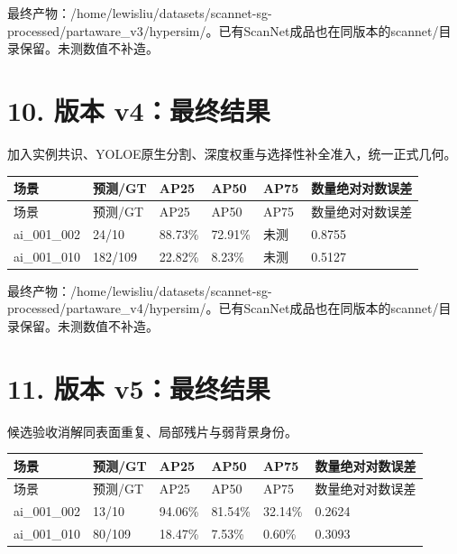 \documentclass[UTF8,fontset=fandol]{ctexart}
\begin{document}
最终产物：/home/lewisliu/datasets/scannet-sg-processed/partaware\_v3/hypersim/。已有ScanNet成品也在同版本的scannet/目录保留。未测数值不补造。



\section*{10. 版本 v4：最终结果}

加入实例共识、YOLOE原生分割、深度权重与选择性补全准入，统一正式几何。



{\small
\begin{longtable}{|p{}|p{}|p{}|p{}|p{}|p{}|}
\hline
场景 & 预测/GT & AP25 & AP50 & AP75 & 数量绝对对数误差 \\ \hline
\endfirsthead
\hline
场景 & 预测/GT & AP25 & AP50 & AP75 & 数量绝对对数误差 \\ \hline
\endhead
ai\_001\_002 & 24/10 & 88.73\% & 72.91\% & 未测 & 0.8755 \\ \hline
ai\_001\_010 & 182/109 & 22.82\% & 8.23\% & 未测 & 0.5127 \\ \hline
\end{longtable}
}

最终产物：/home/lewisliu/datasets/scannet-sg-processed/partaware\_v4/hypersim/。已有ScanNet成品也在同版本的scannet/目录保留。未测数值不补造。



\section*{11. 版本 v5：最终结果}

候选验收消解同表面重复、局部残片与弱背景身份。



{\small
\begin{longtable}{|p{}|p{}|p{}|p{}|p{}|p{}|}
\hline
场景 & 预测/GT & AP25 & AP50 & AP75 & 数量绝对对数误差 \\ \hline
\endfirsthead
\hline
场景 & 预测/GT & AP25 & AP50 & AP75 & 数量绝对对数误差 \\ \hline
\endhead
ai\_001\_002 & 13/10 & 94.06\% & 81.54\% & 32.14\% & 0.2624 \\ \hline
ai\_001\_010 & 80/109 & 18.47\% & 7.53\% & 0.60\% & 0.3093 \\ \hline
\end{longtable}
}
\end{document}

